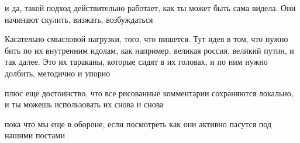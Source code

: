 и да, такой подход действительно работает, как ты может быть сама видела. Они
начинают скулить, визжать, возбуждаться

Касательно смысловой нагрузки, того, что пишется. Тут идея в том, что нужно
бить по их внутренним идолам, как например, великая россия, великий путин, и
так далее. Это их тараканы, которые сидят в их головах, и по ним нужно долбить,
методично и упорно

плюс еще достоинство, что все рисованные комментарии сохраняются локально, и ты
можешь использовать их снова и снова

пока что мы еще в обороне, если посмотреть как они активно пасутся под нашими
постами


